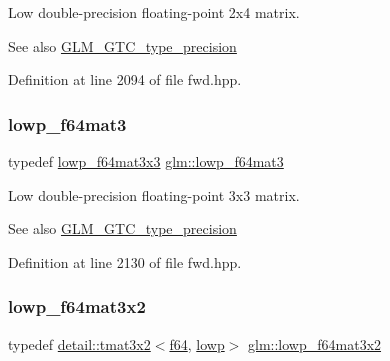 Low double-\/precision floating-\/point 2x4 matrix. \begin{DoxySeeAlso}{See also}
\hyperlink{group__gtc__type__precision}{G\+L\+M\+\_\+\+G\+T\+C\+\_\+type\+\_\+precision} 
\end{DoxySeeAlso}


Definition at line 2094 of file fwd.\+hpp.

\mbox{\label{group__gtc__type__precision_ga4acbda53fb7ff9568c0a2786fad450b8}} 
\subsubsection{\texorpdfstring{lowp\+\_\+f64mat3}{lowp\_f64mat3}}
{\footnotesize\ttfamily typedef \hyperlink{group__gtc__type__precision_ga3b636bef3048da2f7935eae13e66f7b3}{lowp\+\_\+f64mat3x3} \hyperlink{group__gtc__type__precision_ga4acbda53fb7ff9568c0a2786fad450b8}{glm\+::lowp\+\_\+f64mat3}}

Low double-\/precision floating-\/point 3x3 matrix. \begin{DoxySeeAlso}{See also}
\hyperlink{group__gtc__type__precision}{G\+L\+M\+\_\+\+G\+T\+C\+\_\+type\+\_\+precision} 
\end{DoxySeeAlso}


Definition at line 2130 of file fwd.\+hpp.

\mbox{\label{group__gtc__type__precision_ga99f6455a37a4c407a26981561184c76d}} 
\subsubsection{\texorpdfstring{lowp\+\_\+f64mat3x2}{lowp\_f64mat3x2}}
{\footnotesize\ttfamily typedef \hyperlink{structglm_1_1detail_1_1tmat3x2}{detail\+::tmat3x2}$<$\hyperlink{group__gtc__type__precision_ga2bba392e555124b36cde6abba349bab3}{f64}, \hyperlink{namespaceglm_a0f04f086094c747d227af4425893f545ae161af3fc695e696ce3bf69f7332bc2d}{lowp}$>$ \hyperlink{group__gtc__type__precision_ga99f6455a37a4c407a26981561184c76d}{glm\+::lowp\+\_\+f64mat3x2}}

